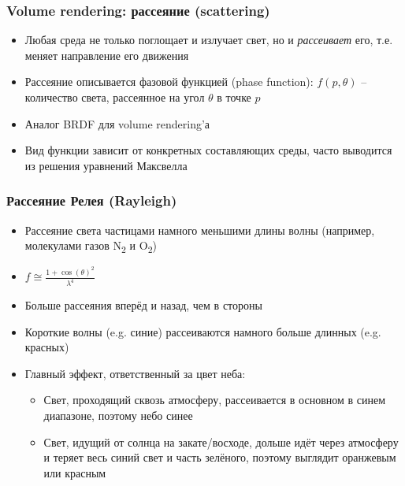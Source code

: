 \documentclass{beamer}
\begin{document}
\begin{frame}[fragile]
\frametitle{Volume rendering: рассеяние (scattering)}
\begin{itemize}
\item Любая среда не только поглощает и излучает свет, но и \textit{рассеивает} его, т.е. меняет направление его движения
\pause
\item Рассеяние описывается фазовой функцией (phase function): \begin{math}f(p, \theta)\end{math} -- количество света, рассеянное на угол \begin{math}\theta\end{math} в точке \begin{math}p\end{math}
\pause
\item Аналог BRDF для volume rendering'а
\pause
\item Вид функции зависит от конкретных составляющих среды, часто выводится из решения уравнений Максвелла
\end{itemize}
\end{frame}

\begin{frame}[fragile]
\frametitle{Рассеяние Релея (Rayleigh)}
\begin{itemize}
\item Рассеяние света частицами намного меньшими длины волны (например, молекулами газов N\textsubscript{2} и O\textsubscript{2})
\pause
\item \begin{math}f \cong \frac{1+\cos(\theta)^2}{\lambda^4}\end{math}
\pause
\item Больше рассеяния вперёд и назад, чем в стороны
\pause
\item Короткие волны (e.g. синие) рассеиваются намного больше длинных (e.g. красных)
\pause
\item Главный эффект, ответственный за цвет неба:
\pause
\begin{itemize}
\item Свет, проходящий сквозь атмосферу, рассеивается в основном в синем диапазоне, поэтому небо синее
\pause
\item Свет, идущий от солнца на закате/восходе, дольше идёт через атмосферу и теряет весь синий свет и часть зелёного, поэтому выглядит оранжевым или красным
\end{itemize}
\end{itemize}
\end{frame}
\end{document}
